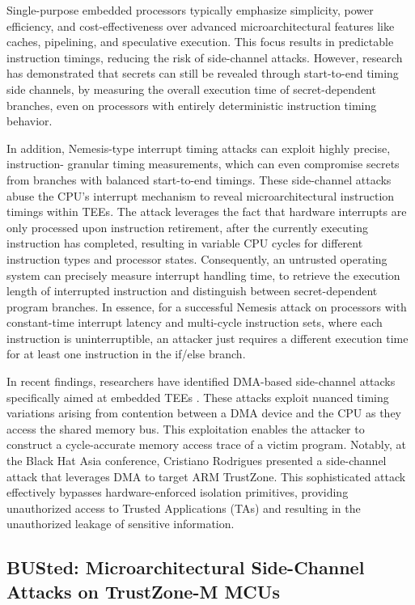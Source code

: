 Single-purpose embedded processors typically emphasize simplicity, power efficiency, and cost-effectiveness over advanced microarchitectural features like caches, pipelining, and speculative execution. This focus results in predictable instruction timings, reducing the risk of side-channel attacks. However, research \cite{Travis, brumley2005remote} has demonstrated that secrets can still be revealed through start-to-end timing side channels, by measuring the overall execution time of secret-dependent branches, even on processors with entirely deterministic instruction timing behavior. 

In addition, Nemesis-type interrupt timing attacks \cite{Nemesis} can exploit highly precise, instruction- granular timing measurements, which can even compromise secrets from branches with balanced start-to-end timings. These side-channel attacks abuse the CPU's interrupt mechanism to reveal microarchitectural instruction timings within \gls{TEE}s. The attack leverages the fact that hardware interrupts are only processed upon instruction retirement, after the currently executing instruction has completed, resulting in variable CPU cycles for different instruction types and processor states. Consequently, an untrusted operating system can precisely measure interrupt handling time, to retrieve the execution length of interrupted instruction and distinguish between secret-dependent program branches. In essence, for a successful Nemesis attack on processors with constant-time interrupt latency and multi-cycle instruction sets, where each instruction is uninterruptible, an attacker just requires a different execution time for at least one instruction in the if/else branch.

In recent findings, researchers have identified DMA-based side-channel attacks specifically aimed at embedded TEEs \cite{busted, marton}. These attacks exploit nuanced timing variations arising from contention between a DMA device and the CPU as they access the shared memory bus. This exploitation enables the attacker to construct a cycle-accurate memory access trace of a victim program. Notably, at the Black Hat Asia conference, Cristiano Rodrigues presented a side-channel attack that leverages DMA to target ARM TrustZone. This sophisticated attack effectively bypasses hardware-enforced isolation primitives, providing unauthorized access to Trusted Applications (\gls{TA}s) and resulting in the unauthorized leakage of sensitive information.

\subsection{BUSted: Microarchitectural Side-Channel Attacks on TrustZone-M MCUs}

